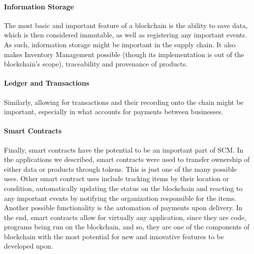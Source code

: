 \paragraph{Information Storage}
The most basic and important feature of a blockchain is the ability to save data, which is then considered immutable, as well as registering any important events. As such, information storage might be important in the supply chain. It also makes Inventory Management possible (though its implementation is out of the blockchain's scope), traceability and provenance of products.
      
\paragraph{Ledger and Transactions}
Similarly, allowing for transactions and their recording onto the chain might be important, especially in what accounts for payments between businesses.
  
\paragraph{Smart Contracts}
Finally, smart contracts have the potential to be an important part of SCM. In the applications we described, smart contracts were used to transfer ownership of either data or products through tokens. This is just one of the many possible uses. Other smart contract uses include tracking items by their location or condition, automatically updating the status on the blockchain and reacting to any important events by notifying the organization responsible for the items. Another possible functionality is the automation of payments upon delivery. In the end, smart contracts allow for virtually any application, since they are code, programs being run on the blockchain, and so, they are one of the components of blockchain with the most potential for new and innovative features to be developed upon.

